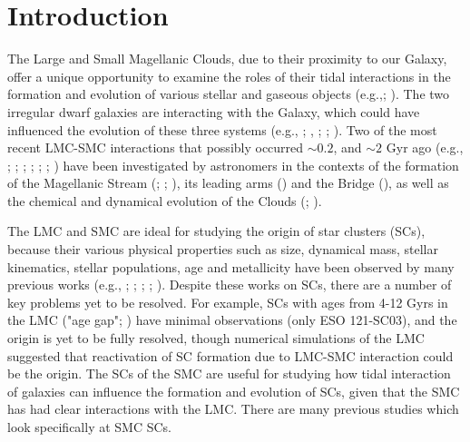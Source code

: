 \documentclass[fleqn,usenatbib]{mnras}
\begin{document}
\section{Introduction}
The Large and Small Magellanic Clouds, due to their proximity to our Galaxy, offer a unique opportunity to examine the roles of their tidal interactions in the formation and evolution of various stellar and gaseous objects (e.g.,\citealt{K11_Westerlund1997}; \citealt{K43_DOnghia_Fox2016}). The two irregular dwarf galaxies are interacting with the Galaxy, which could have influenced the evolution of these three systems (e.g., \citealt{78Murai_Fujimoto1980}; \citealt{K12_Weinberg2000}, \citealt{69Yoshizawa_Noguchi2003}; \citealt{K13_Besla_et_al2012}; \citealt{K3_Diaz_Bekki2012}). 
Two of the most recent LMC-SMC interactions that possibly occurred ${\sim}0.2$, and ${\sim}2$ Gyr ago (e.g., \citealt{69Yoshizawa_Noguchi2003}; \citealt{20Harris_Zaritsky2004}; \citealt{1Rafelski_Zaritsky2005}; \citealt{29Bekki_Chiba2007}; \citealt{17Bekki_Chiba2009}; \citealt{11Bitsakis_et_al2018}; \citealt{39Nayak_et_al2018}) have been investigated by astronomers in the contexts of the formation of the Magellanic Stream (\citealt{K15_Gardiner_Noguchi1996}; \citealt{67Sawa_Fujimoto_Kumai1999}; \citealt{89Pardy_DOnghia_Fox2018}), its leading arms (\citealt{M6_Cullinane_et_al2021}) and the Bridge (\citealt{24Zivick_et_al2019}), as well as the chemical and dynamical evolution of the Clouds (\citealt{M8_Bekki_Chiba2005}; \citealt{M9_Patel_et_al2020}).


The LMC and SMC are ideal for studying the origin of star clusters (SCs), because their various physical properties such as size, dynamical mass, stellar kinematics, stellar populations, age and metallicity have been observed by many previous works (e.g., \citealt{27Grebel_et_al1999}; \citealt{5Da_Costa2002}; \citealt{40Glatt_Grebel_Koch2010}; \citealt{56Perren_Piatti_V2017}; \citealt{53Piatti2020}). Despite these works on SCs, there are a number of key problems yet to be resolved. For example, SCs with ages from 4-12 Gyrs in the LMC ("age gap"; \citealt{K14_Da_Costa1991}) have minimal observations (only ESO 121-SC03), and the origin is yet to be fully resolved, though numerical simulations of the LMC suggested that reactivation of SC formation due to LMC-SMC interaction could be the origin. The SCs of the SMC are useful for studying how tidal interaction of galaxies can influence the formation and evolution of SCs, given that the SMC has had clear interactions with the LMC. There are many previous studies which look specifically at SMC SCs.
\end{document}
